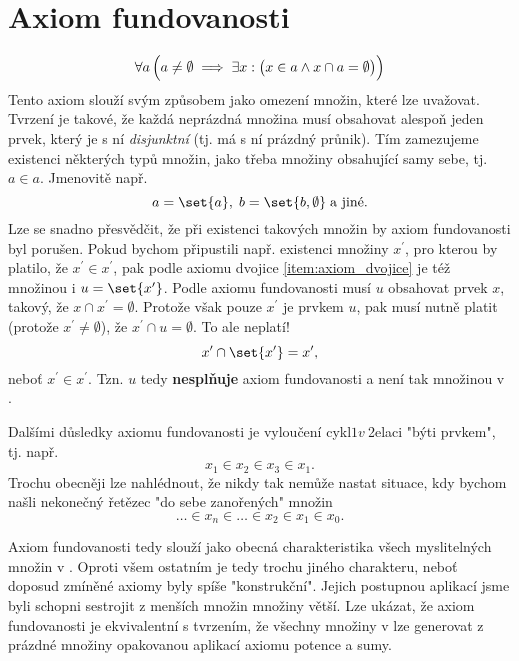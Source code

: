 \section{Axiom fundovanosti}\label{sec:axiom_fundovanosti}
\begin{equation*}
    \forall a\,\Bigl(a\neq\emptyset \implies \exists x:\bigl(x\in a \land x\cap a=\emptyset\bigr)\Bigr)
\end{equation*}
Tento axiom slouží svým způsobem jako omezení množin, které lze uvažovat. Tvrzení je takové, že každá neprázdná množina musí obsahovat alespoň jeden prvek, který je s ní \emph{disjunktní} (tj. má s ní prázdný průnik). Tím zamezujeme existenci některých typů množin, jako třeba množiny obsahující samy sebe, tj. $a\in a$. Jmenovitě např.
\begin{equation*}
    a=\set{a},\;b=\set{b,\emptyset}\;\text{a jiné.}
\end{equation*}
Lze se snadno přesvědčit, že při existenci takových množin by axiom fundovanosti byl porušen. Pokud bychom připustili např. existenci množiny $x^\prime$, pro kterou by platilo, že $x^\prime\in x^\prime$, pak podle axiomu dvojice \ref{item:axiom_dvojice} je též množinou i $u=\set{x^\prime}$. Podle axiomu fundovanosti musí $u$ obsahovat prvek $x$, takový, že $x\cap x^\prime=\emptyset$. Protože však pouze $x^\prime$ je prvkem $u$, pak musí nutně platit (protože $x^\prime\neq\emptyset$), že $x^\prime\cap u=\emptyset$. To ale neplatí!
\begin{equation*}
    x^\prime\cap\set{x^\prime}=x^\prime,
\end{equation*}
neboť $x^\prime\in x^\prime$. Tzn. $u$ tedy \textbf{nesplňuje} axiom fundovanosti a není tak množinou v \ZF{}.\par
Dalšími důsledky axiomu fundovanosti je vyloučení cykl$1 v~$2elaci "býti prvkem", tj. např.
\begin{equation*}
    x_1\in x_2\in x_3\in x_1.
\end{equation*}
Trochu obecněji lze nahlédnout, že nikdy tak nemůže nastat situace, kdy bychom našli nekonečný řetězec "do sebe zanořených" množin
\begin{equation*}
    \dots \in x_n\in \dots\in x_2\in x_1\in x_0.
\end{equation*}
\medskip

Axiom fundovanosti tedy slouží jako obecná charakteristika všech myslitelných množin v \ZF{}. Oproti všem ostatním je tedy trochu jiného charakteru, neboť doposud zmíněné axiomy byly spíše "konstrukční". Jejich postupnou aplikací jsme byli schopni sestrojit z menších množin množiny větší. Lze ukázat, že axiom fundovanosti je ekvivalentní s tvrzením, že všechny množiny v \ZF{} lze generovat z prázdné množiny opakovanou aplikací axiomu potence a sumy.